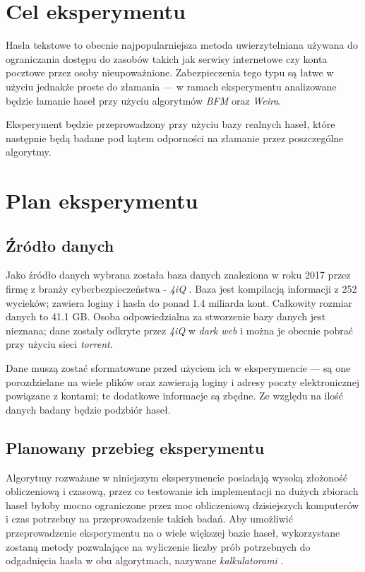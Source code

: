 \documentclass{article}
\begin{document}
	\section{Cel eksperymentu}
	Hasła tekstowe to obecnie najpopularniejsza metoda uwierzytelniana używana do ograniczania dostępu do zasobów takich jak serwisy internetowe czy konta pocztowe przez osoby nieupoważnione. Zabezpieczenia tego typu są łatwe w użyciu jednakże proste do złamania — w ramach eksperymentu analizowane będzie łamanie haseł przy użyciu algorytmów \textit{BFM} oraz \textit{Weira}.
	
	Eksperyment będzie przeprowadzony przy użyciu bazy realnych haseł, które następnie będą badane pod kątem odporności na złamanie przez poszczególne algorytmy.
	
	\section{Plan eksperymentu}
	\subsection{Źródło danych}
	Jako źródło danych wybrana została baza danych znaleziona w roku 2017 przez firmę z branży cyberbezpieczeństwa - \textit{4iQ} \cite{breach}. Baza jest kompilacją informacji z 252 wycieków; zawiera loginy i hasła do ponad 1.4 miliarda kont. Całkowity rozmiar danych to 41.1 GB. Osoba odpowiedzialna za stworzenie bazy danych jest nieznana; dane zostały odkryte przez \textit{4iQ} w \textit{dark web} i można je obecnie pobrać przy użyciu sieci \textit{torrent}.
	
	Dane muszą zostać sformatowane przed użyciem ich w eksperymencie — są one porozdzielane na wiele plików oraz zawierają loginy i adresy poczty elektronicznej powiązane z kontami; te dodatkowe informacje są zbędne. Ze względu na ilość danych badany będzie podzbiór haseł.
	
	\subsection{Planowany przebieg eksperymentu}
	Algorytmy rozważane w niniejszym eksperymencie posiadają wysoką złożoność obliczeniową i czasową, przez co testowanie ich implementacji na dużych zbiorach haseł byłoby mocno ograniczone przez moc obliczeniową dzisiejszych komputerów i czas potrzebny na przeprowadzenie takich badań. Aby umożliwić przeprowadzenie eksperymentu na o wiele większej bazie haseł, wykorzystane zostaną metody pozwalające na wyliczenie liczby prób potrzebnych do odgadnięcia hasła w obu algorytmach, nazywane \textit{kalkulatorami} \cite{calc}. 
	
\end{document}

